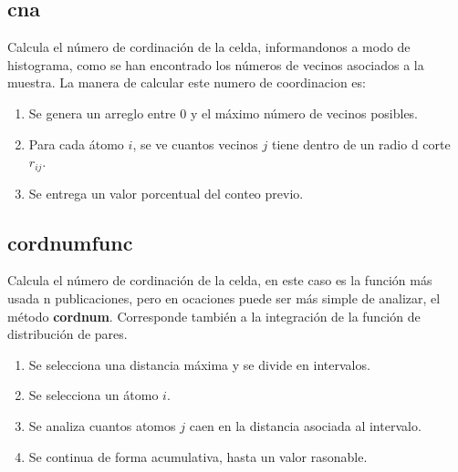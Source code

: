 
\subsection{cna}
Calcula el n\'umero de cordinaci\'on de la celda, informandonos a modo de
histograma, como se han encontrado los n\'umeros de vecinos asociados a la
muestra. La manera de calcular este numero de coordinacion es:

\begin{enumerate}
 \item Se genera un arreglo entre 0 y el m\'aximo n\'umero de vecinos posibles.
 \item Para cada \'atomo $i$, se ve cuantos vecinos $j$ tiene dentro de un radio
d corte $r_{ij}$.
 \item Se entrega un valor porcentual del conteo previo.
\end{enumerate}


\subsection{cordnumfunc}
Calcula el n\'umero de cordinaci\'on de la celda, en este caso es la funci\'on
m\'as usada n publicaciones, pero en ocaciones puede ser m\'as simple de
analizar, el m\'etodo \textbf{cordnum}. Corresponde tambi\'en a la integraci\'on
de la funci\'on de distribuci\'on de pares.
\begin{enumerate}
 \item Se selecciona una distancia m\'axima y se divide en intervalos.
 \item Se selecciona un \'atomo $i$.
 \item Se analiza cuantos atomos $j$ caen en la distancia asociada al intervalo.
 \item Se continua de forma acumulativa, hasta un valor rasonable.
\end{enumerate}

